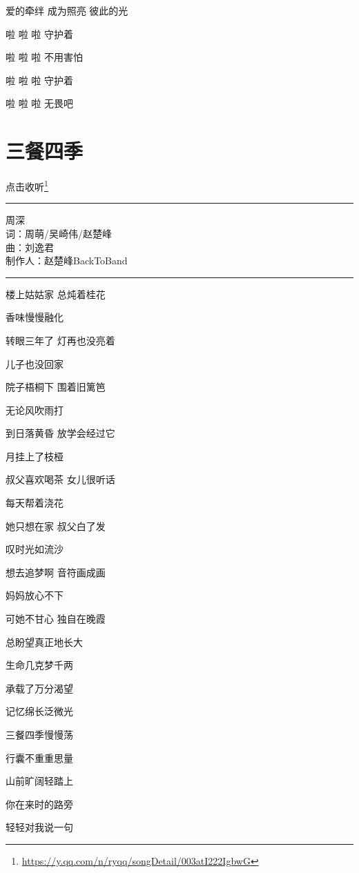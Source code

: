 \documentclass[]{ctexbook}
\renewcommand{\href}[2]{#2\footnote{\url{#1}}}
\begin{document}
爱的牵绊 成为照亮 彼此的光

啦 啦 啦 守护着

啦 啦 啦 不用害怕

啦 啦 啦 守护着

啦 啦 啦 无畏吧

\section*{三餐四季}\label{three-meals-a-day}


\href{https://y.qq.com/n/ryqq/songDetail/003atI222IgbwG}{点击收听}

\begin{center}\rule{0.5\linewidth}{0.5pt}\end{center}

周深\\
词：周萌/吴崎伟/赵楚峰\\
曲：刘逸君\\
制作人：赵楚峰BackToBand

\begin{center}\rule{0.5\linewidth}{0.5pt}\end{center}

楼上姑姑家 总炖着桂花

香味慢慢融化

转眼三年了 灯再也没亮着

儿子也没回家

院子梧桐下 围着旧篱笆

无论风吹雨打

到日落黄昏 放学会经过它

月挂上了枝桠

叔父喜欢喝茶 女儿很听话

每天帮着浇花

她只想在家 叔父白了发

叹时光如流沙

想去追梦啊 音符画成画

妈妈放心不下

可她不甘心 独自在晚霞

总盼望真正地长大

生命几克梦千两

承载了万分渴望

记忆绵长泛微光

三餐四季慢慢荡

行囊不重重思量

山前旷阔轻踏上

你在来时的路旁

轻轻对我说一句
\end{document}
